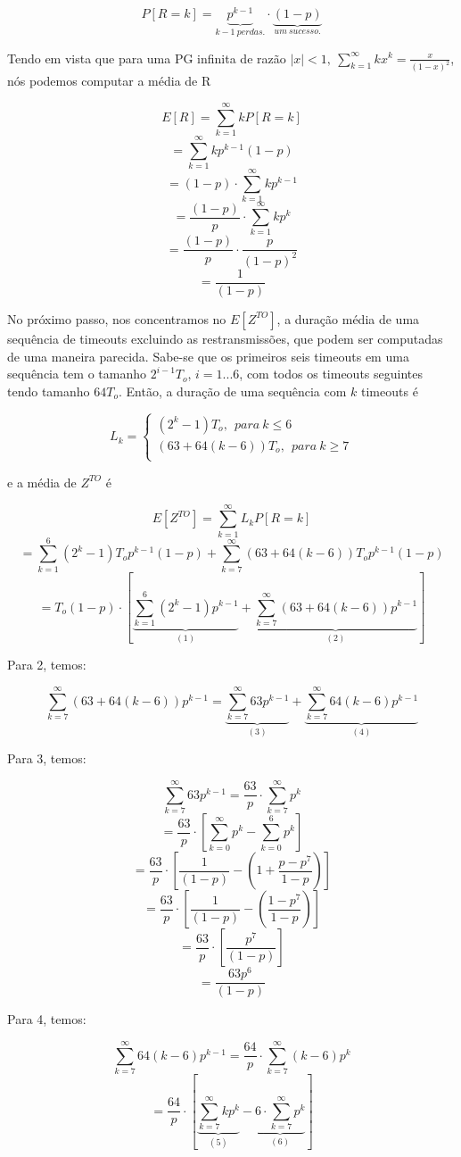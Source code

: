 $$P[R = k] = \underbrace{p^{k-1}}_{k-1 \ perdas.} \cdot \underbrace{(1-p)}_{um \ sucesso.} $$

Tendo em vista que para uma PG infinita de razão $|x|<1, \ \sum_{k=1}^{\infty}kx^k = \frac{x}{(1-x)^2} $, nós podemos computar a média de R

$$E[R] = \sum_{k=1}^{\infty}kP[R=k]$$
$$= \sum_{k=1}^{\infty}kp^{k-1}(1-p)$$
$$= (1-p)\cdot \sum_{k=1}^{\infty}kp^{k-1}$$
$$= \frac{(1-p)}{p}\cdot \sum_{k=1}^{\infty}kp^{k}$$
$$= \frac{(1-p)}{p}\cdot \frac{p}{(1-p)^2}$$
$$= \frac{1}{(1-p)}$$

No próximo passo, nos concentramos no $E[Z^{TO}]$, a duração média de uma sequência de timeouts excluindo as restransmissões, que podem ser computadas de uma maneira parecida. Sabe-se que os primeiros seis timeouts em uma sequência tem o tamanho $2^{i-1}T_o$, $i = 1...6$, com todos os timeouts seguintes tendo tamanho $64T_o$. Então, a duração de uma sequência com $k$ timeouts é

$$L_k = \begin{cases} 
  (2^k - 1)T_o,  \ \  para \  k \leq 6 \\
  (63 + 64(k-6))T_o,  \ \ para  \ k \geq 7\\
\end{cases} $$

e a média de $Z^{TO}$ é

$$E[Z^{TO}] = \sum_{k=1}^{\infty}L_kP[R=k] $$
$$=  \sum_{k=1}^{6}(2^k -1)T_op^{k-1}(1-p) + \sum_{k=7}^{\infty}(63+64(k-6))T_op^{k-1}(1-p)$$
$$=  T_o(1-p) \cdot [\underbrace{\sum_{k=1}^{6}(2^k -1)p^{k-1}}_{(1)} + \underbrace{\sum_{k=7}^{\infty}(63+64(k-6))p^{k-1}}_{(2)}] $$

Para 2, temos:

$$\sum_{k=7}^{\infty}(63+64(k-6))p^{k-1} = \underbrace{\sum_{k=7}^{\infty}63p^{k-1}}_{(3)} + \underbrace{\sum_{k=7}^{\infty}64(k-6)p^{k-1}}_{(4)} $$

Para 3, temos:

$$\sum_{k=7}^{\infty}63p^{k-1} = \frac{63}{p}\cdot \sum_{k=7}^{\infty}p^{k} $$
$$ = \frac{63}{p}\cdot [\sum_{k=0}^{\infty}p^{k} - \sum_{k=0}^{6}p^{k}] $$
$$ = \frac{63}{p}\cdot [\frac{1}{(1-p)} - (1 + \frac{p - p^7}{1-p})] $$
$$ = \frac{63}{p}\cdot [\frac{1}{(1-p)} - (\frac{1 - p^7}{1-p})] $$
$$ = \frac{63}{p}\cdot [\frac{p^7}{(1-p)}] $$
$$ = \frac{63p^6}{(1-p)} $$

Para 4, temos:

$$\sum_{k=7}^{\infty}64(k-6)p^{k-1} =  \frac{64}{p} \cdot \sum_{k=7}^{\infty}(k-6)p^{k}$$
$$ =  \frac{64}{p} \cdot [\underbrace{\sum_{k=7}^{\infty}kp^{k}}_{(5)} - \underbrace{6 \cdot \sum_{k=7}^{\infty}p^{k}}_{(6)}]  $$


